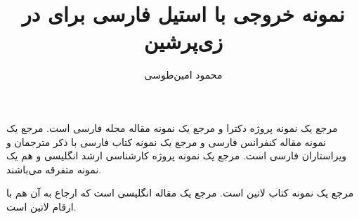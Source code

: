 \documentclass[11pt,a4paper]{article}
\title{نمونه خروجی با استیل فارسی \lr{acm-fa} برای \lr{BibTeX} در زی‌پرشین}
\author{محمود امین‌طوسی}\date{}
\begin{document}
\maketitle

مرجع \cite{Omidali82phdThesis} یک نمونه پروژه دکترا و مرجع \cite{Vahedi87} یک نمونه مقاله مجله فارسی است.
مرجع \cite{Amintoosi87afzayesh}  یک نمونه  مقاله کنفرانس فارسی و
مرجع \cite{Pedram80osool} یک نمونه کتاب فارسی با ذکر مترجمان و ویراستاران فارسی است. مرجع \cite{Khalighi07MscThesis} یک نمونه پروژه کارشناسی ارشد انگلیسی و
\cite{Khalighi87xepersian} هم یک نمونه متفرقه  می‌باشند.

مرجع \cite{Gonzalez02book} یک نمونه کتاب لاتین است. مرجع  یک مقاله انگلیسی است که ارجاع به آن هم با ارقام لاتین است.


{\small



}
\end{document}
